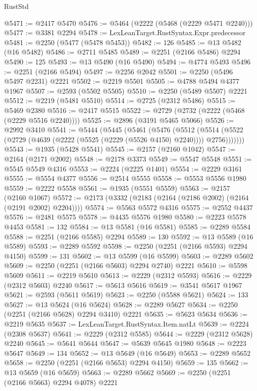 \begin{lexlean}{RustStd}
\begin{coremodule}
@5471 := @2417 @5470
@5476 := @5464 (@2222 (@5468 (@2229 @5471 @2240)))
@5477 := @3381 @2294
@5478 := LexLeanTarget.RustSyntax.Expr.predecessor
@5481 := @2250 (@5477 (@5478 @5453))
@5482 := 126
@5485 := @13 @5482 (@16 @5482)
@5486 := @2711 @5485
@5489 := @2251 (@2166 @5486) @2294
@5490 := 125
@5493 := @13 @5490 (@16 @5490)
@5494 := @4774 @5493
@5496 := @2251 (@2166 @5494)
@5497 := @2256 @2042
@5501 := @2250 (@5496 @5497 @2231) @2221
@5502 := @2219 @5501
@5505 := @4788 @5494 @4377 @1967
@5507 := @2593 (@5502 @5505)
@5510 := @2250 (@5489 @5507) @2221
@5512 := @2219 (@5481 @5510)
@5514 := @2725 (@2312 @5486)
@5515 := @5469 @2380
@5516 := @2417 @5515
@5522 := @2729 (@2732 (@2222 (@5468 (@2229 @5516 @2240))))
@5525 := @2896 (@3191 @5465 @5066)
@5526 := @2992 @3410
@5541 := @5444
    (@5445
      (@5461
        (@5476
          (@5512
            (@5514 (@5522 (@2729 (@4639 (@2222 (@5525 (@2229 (@5526 @4150) @2240)))) @2756)))))))
@5543 := @1935 (@5428 @5541)
@5545 := @2157 (@2160 @1042)
@5547 := @2164 (@2171 @2002)
@5548 := @2178 @3373
@5549 := @5547 @5548
@5551 := @5545 @5549 @4316
@5553 := @2224 (@2225 @1401)
@5554 := @2229 @3161
@5555 := @5554 @4377
@5556 := @2514 @5555
@5558 := @5553 @5556 @1980
@5559 := @2222 @5558
@5561 := @1935 (@5551 @5559)
@5563 := @2157 (@2160 @1067)
@5572 := @2173 (@3332 (@2183 (@2164 (@2186 @2002) (@2164 (@2191 @2002) @2204))))
@5574 := @5563 @5572 @4316
@5575 := @2552 @4437
@5576 := @2481 @5575
@5578 := @4435 @5576 @1980
@5580 := @2223 @5578 @4453
@5581 := 132
@5584 := @13 @5581 (@16 @5581)
@5585 := @2289 @5584
@5588 := @2251 (@2166 @5585) @2294
@5589 := 130
@5592 := @13 @5589 (@16 @5589)
@5593 := @2289 @5592
@5598 := @2250 (@2251 (@2166 @5593) @2294 @4150)
@5599 := 131
@5602 := @13 @5599 (@16 @5599)
@5603 := @2289 @5602
@5609 := @2250 (@2251 (@2166 @5603) @2294 @2740) @2221
@5610 := @5598 @5609
@5611 := @2219 @5610
@5613 := @2229 (@2312 @5593)
@5616 := @2229 (@2312 @5603) @2240
@5617 := @5613 @5616
@5619 := @3541 @5617 @1967
@5621 := @2593 (@5611 @5619)
@5623 := @2250 (@5588 @5621)
@5624 := 133
@5627 := @13 @5624 (@16 @5624)
@5628 := @2289 @5627
@5634 := @2250 (@2251 (@2166 @5628) @2294 @3410) @2221
@5635 := @5623 @5634
@5636 := @2219 @5635
@5637 := LexLeanTarget.RustSyntax.Item.natLt
@5639 := @2224 (@2308 @5637)
@5641 := @2229 (@2312 @5585)
@5644 := @2229 (@2312 @5628) @2240
@5645 := @5641 @5644
@5647 := @5639 @5645 @1980
@5648 := @2223 @5647
@5649 := 134
@5652 := @13 @5649 (@16 @5649)
@5653 := @2289 @5652
@5658 := @2250 (@2251 (@2166 @5653) @2294 @4150)
@5659 := 135
@5662 := @13 @5659 (@16 @5659)
@5663 := @2289 @5662
@5669 := @2250 (@2251 (@2166 @5663) @2294 @4078) @2221

\end{coremodule}
\end{lexlean}
